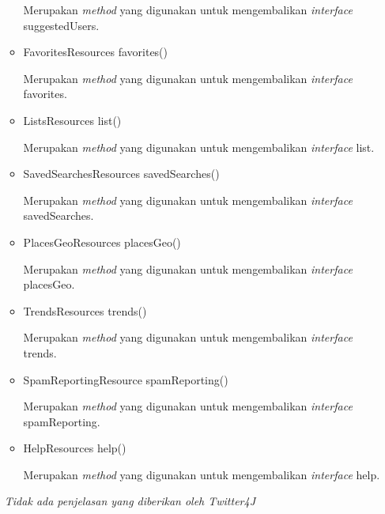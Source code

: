 \begin{itemize}
\begin{itemize}
			Merupakan \textit{method} yang digunakan untuk mengembalikan \textit{interface} suggestedUsers.
			\item FavoritesResources favorites()
			
			Merupakan \textit{method} yang digunakan untuk mengembalikan \textit{interface} favorites.
			\item ListsResources list()
			
			Merupakan \textit{method} yang digunakan untuk mengembalikan \textit{interface} list.
			\item SavedSearchesResources savedSearches()
			
			Merupakan \textit{method} yang digunakan untuk mengembalikan \textit{interface} savedSearches.
			\item PlacesGeoResources placesGeo()
			
			Merupakan \textit{method} yang digunakan untuk mengembalikan \textit{interface} placesGeo.
			\item TrendsResources trends()
			
			Merupakan \textit{method} yang digunakan untuk mengembalikan \textit{interface} trends.
			\item SpamReportingResource spamReporting()
			
			Merupakan \textit{method} yang digunakan untuk mengembalikan \textit{interface} spamReporting.
			\item HelpResources help()
			
			Merupakan \textit{method} yang digunakan untuk mengembalikan \textit{interface} help.
		\end{itemize}
		\textit{Tidak ada penjelasan yang diberikan oleh Twitter4J}
	\end{itemize}
	
